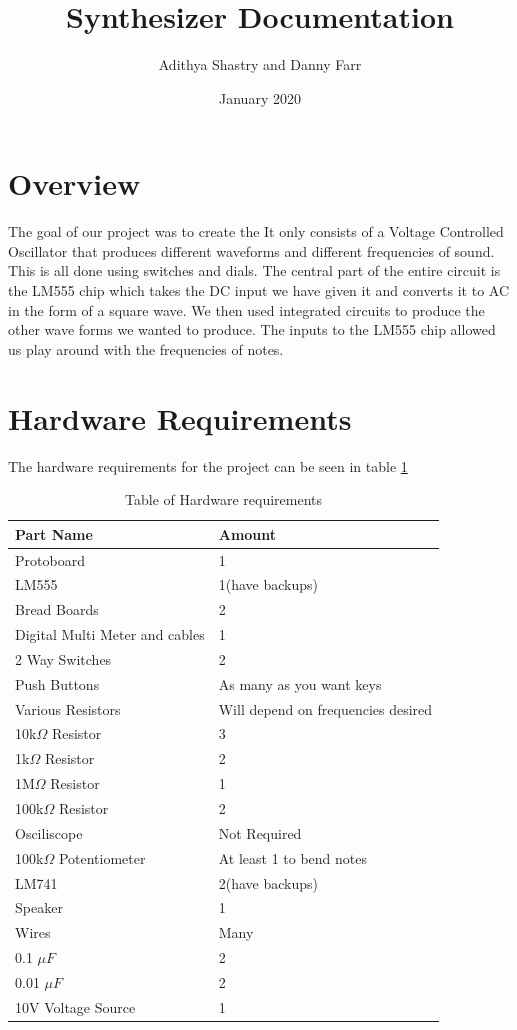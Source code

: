 \documentclass[12pt]{article}
\title{Synthesizer Documentation}
\author{Adithya Shastry and Danny Farr}
\date{January 2020}
\begin{document}
\maketitle
\newpage
\tableofcontents
\newpage
\section{Overview}
The goal of our project was to create the It only consists of a Voltage Controlled Oscillator that produces different waveforms and different frequencies of sound. This is all done using switches and dials. The central part of the entire circuit is the LM555 chip which takes the DC input we have given it and converts it to AC in the form of a square wave. We then used integrated circuits to produce the other wave forms we wanted to produce. The inputs to the LM555 chip allowed us play around with the frequencies of notes. 
\section{Hardware Requirements}
The hardware requirements for the project can be seen in table \ref{Parts List}
\begin{table}[h!]
\centering
\begin{tabular}{|l|l|}
\hline
\textbf{Part Name} & \textbf{Amount} \\ \hline
Protoboard & 1 \\ \hline
LM555 & 1(have backups) \\ \hline
Bread Boards & 2 \\ \hline
Digital Multi Meter and cables & 1 \\ \hline
2 Way Switches & 2 \\ \hline
Push Buttons & As many as you want keys \\ \hline
Various Resistors & Will depend on frequencies desired \\ \hline
10k$\Omega$ Resistor & 3 \\ \hline
1k$\Omega$ Resistor & 2 \\ \hline
1M$\Omega$ Resistor & 1 \\ \hline
100k$\Omega$ Resistor & 2 \\ \hline
Osciliscope & Not Required \\ \hline
100k$\Omega$ Potentiometer & At least 1 to bend notes \\ \hline
LM741 & 2(have backups) \\ \hline
Speaker & 1 \\ \hline
Wires & Many \\ \hline
0.1 $\mu F$ & 2 \\ \hline
0.01 $\mu F$ & 2 \\ \hline
10V Voltage Source & 1 \\ \hline
\end{tabular}
\caption{Table of Hardware requirements}
\label{Parts List}
\end{table}
\end{document}
